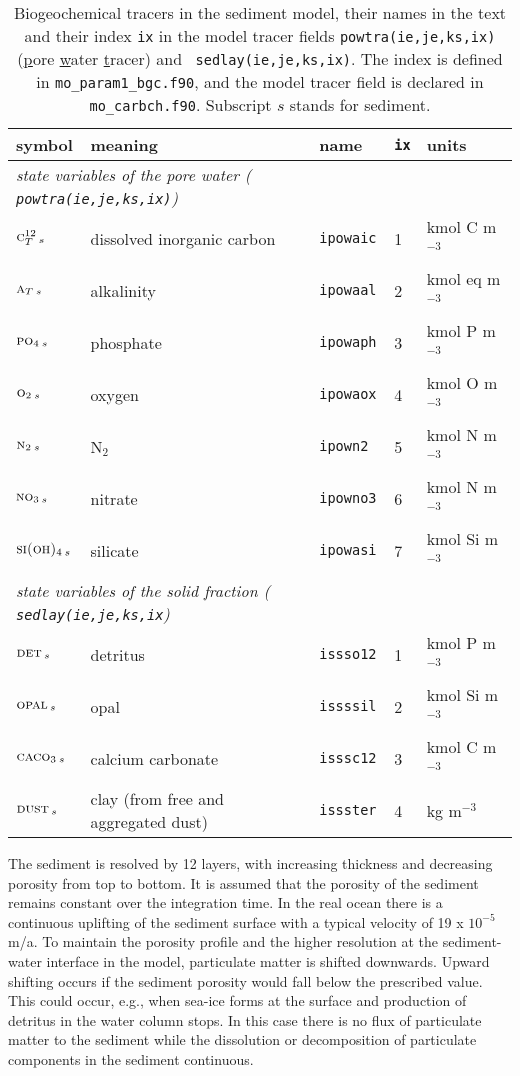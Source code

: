 \documentclass[11pt,a4paper,fleqn,twoside]{article}
\def\pho{\text{\textsc{po$_4$}}\,}
\def\nit{\text{\textsc{no$_3$}}\,}
\def\ntwo{\text{\textsc{n$_2$}}\,}
\def\car{\text{\textsc{c$_T^{12}$}}\,}
\def\oxy{\text{\textsc{o$_2$}}\,}
\def\alk{\text{\textsc{a$_T$}}\,}
\def\sio{\text{\textsc{si(oh)$_4$}}\,}
\def\det{\text{\textsc{det}}\,}
\def\opal{\text{\textsc{opal}}\,}
\def\cal{\text{\textsc{caco$_3$}}\,}
\def\dust{\text{\textsc{dust}}\,}
\newcommand{\concP}{kmol P m$^{-3}$\,}
\newcommand{\concN}{kmol N m$^{-3}$\,}
\newcommand{\concC}{kmol C m$^{-3}$\,}
\newcommand{\concO}{kmol O m$^{-3}$\,}
\newcommand{\concSi}{kmol Si m$^{-3}$\,}
\newcommand{\concalk}{kmol eq m$^{-3}$\,}
\newcommand{\concdust}{kg m$^{-3}$\,}
\begin{document}
\begin{table}[htb]
{\caption{\label{tab_sedi_tracers}  Biogeochemical tracers in the sediment
model, their names in the text and their index {\tt ix} in the model  tracer
fields {\tt powtra(ie,je,ks,ix)} ({\underline po}re {\underline wa}ter {\underline tra}cer) and  {\tt
sedlay(ie,je,ks,ix)}. The index is defined in {\tt mo\_param1\_bgc.f90}, and the
model tracer field is declared in {\tt mo\_carbch.f90}. Subscript $s$ stands for sediment.} }
\vspace{.2cm}
\renewcommand{\baselinestretch}{1}
\footnotesize
\begin{center}
\begin{tabular}{lllll} \hline
symbol & meaning & name & {\tt ix} & units \\ \hline
\multicolumn{3}{l}{\it state variables of the pore water ({\tt
powtra(ie,je,ks,ix)})}\\
$\car_s$  & dissolved inorganic carbon &{\tt ipowaic}  & 1 & \concC \\
$\alk_s$  & alkalinity        &{\tt ipowaal}  &  2 & \concalk \\
$\pho_s$  & phosphate         &{\tt ipowaph}  &  3 & \concP \\
$\oxy_s$  & oxygen            &{\tt ipowaox}  &  4 & \concO \\
$\ntwo_s$ & N$_2$             &{\tt ipown2}   &  5 & \concN \\
$\nit_s$  & nitrate           &{\tt ipowno3}  &  6 & \concN \\
$\sio_s$  & silicate          &{\tt ipowasi}  &  7 & \concSi \\ \hline
\multicolumn{3}{l}{\it state variables of the solid fraction ({\tt
sedlay(ie,je,ks,ix})}\\
$\det_s$  & detritus          &{\tt issso12}  & 1 & \concP \\
$\opal_s$ & opal              &{\tt issssil}  & 2 & \concSi \\
$\cal_s$  & calcium carbonate &{\tt isssc12}  & 3 & \concC \\ 
$\dust_s$  & clay (from free and aggregated dust) &{\tt issster}  & 4 & \concdust \\ \hline
\end{tabular}
\end{center}
\renewcommand{\baselinestretch}{1.5}
\normalsize
\end{table}

The sediment is resolved by 12 layers, with increasing thickness
and  decreasing porosity from top to bottom. It is assumed that the
porosity of the sediment remains constant over the integration time.
In the real ocean there is a continuous uplifting of the sediment 
surface with a typical velocity of 19 x $10^{-5}$ m/a. To maintain
the porosity profile and the higher resolution at the sediment-water 
interface in the model, particulate matter is shifted downwards. Upward
shifting occurs if the sediment porosity would fall below the prescribed value.
This could occur, e.g., when sea-ice forms at the surface and production of detritus 
in the water column stops. In this case there is no flux of particulate 
matter to the sediment while the dissolution or 
decomposition of particulate components in the sediment continuous.
\end{document}
